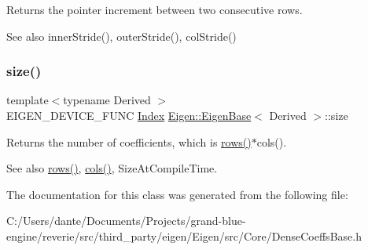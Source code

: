 \begin{DoxyReturn}{Returns}
the pointer increment between two consecutive rows.
\end{DoxyReturn}
\begin{DoxySeeAlso}{See also}
inner\+Stride(), outer\+Stride(), col\+Stride() 
\end{DoxySeeAlso}
\mbox{\label{class_eigen_1_1_dense_coeffs_base_3_01_derived_00_01_direct_accessors_01_4_ac2c9348df3bb9c0044dbae6c278a8977}} 
\subsubsection{\texorpdfstring{size()}{size()}}
{\footnotesize\ttfamily template$<$typename Derived $>$ \\
E\+I\+G\+E\+N\+\_\+\+D\+E\+V\+I\+C\+E\+\_\+\+F\+U\+NC \mbox{\hyperlink{struct_eigen_1_1_eigen_base_a554f30542cc2316add4b1ea0a492ff02}{Index}} \mbox{\hyperlink{struct_eigen_1_1_eigen_base}{Eigen\+::\+Eigen\+Base}}$<$ Derived $>$\+::size\hspace{0.3cm}{\ttfamily [inline]}}

\begin{DoxyReturn}{Returns}
the number of coefficients, which is \mbox{\hyperlink{struct_eigen_1_1_eigen_base_a8141320ba8df384426c298b32b000d8e}{rows()}}$\ast$cols(). 
\end{DoxyReturn}
\begin{DoxySeeAlso}{See also}
\mbox{\hyperlink{struct_eigen_1_1_eigen_base_a8141320ba8df384426c298b32b000d8e}{rows()}}, \mbox{\hyperlink{struct_eigen_1_1_eigen_base_a7b0b45c7351847696c911ce8aa2abbdb}{cols()}}, Size\+At\+Compile\+Time. 
\end{DoxySeeAlso}


The documentation for this class was generated from the following file\+:\begin{DoxyCompactItemize}
\item 
C\+:/\+Users/dante/\+Documents/\+Projects/grand-\/blue-\/engine/reverie/src/third\+\_\+party/eigen/\+Eigen/src/\+Core/Dense\+Coeffs\+Base.\+h\end{DoxyCompactItemize}
